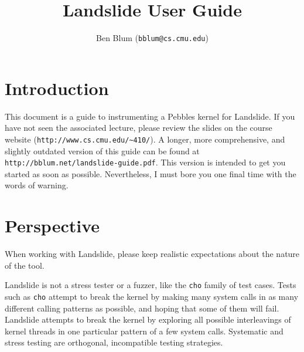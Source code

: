\documentclass{article}
\begin{document}
\captionsetup{width=.75\textwidth,font=small,labelfont=bf}
\title{\bf Landslide User Guide}
\author{Ben Blum (\texttt{bblum@cs.cmu.edu})}
\maketitle

\newcommand\true{\;\textit{true}}
\newcommand\false{\;\textit{false}}

\newcommand\alpher\alpha
\newcommand\beter\beta
\newcommand\gammer\gamma
\newcommand\delter\delta
\newcommand\zeter\zeta
\newcommand\Sigmer\Sigma

\newcommand\NN{\mathbb{N}}
\newcommand\QQ{\mathbb{Q}}
\newcommand\RR{\mathbb{R}}
\newcommand\ZZ{\mathbb{Z}}

\section{Introduction}

This document is a guide to instrumenting a Pebbles kernel for Landslide. If you have not seen the associated lecture, please review the slides on the course website (\texttt{http://www.cs.cmu.edu/{\textasciitilde}410/}).
A longer, more comprehensive, and slightly outdated version of this guide can be found at \texttt{http://bblum.net/landslide-guide.pdf}.
This version is intended to get you started as soon as possible.
Nevertheless, I must bore you one final time with the words of warning.

\section{Perspective}
\label{sec:expect}

When working with Landslide, please keep realistic expectations about the nature of the tool.

Landslide is not a stress tester or a fuzzer, like the \texttt{cho} family of test cases.
Tests such as \texttt{cho} attempt to break the kernel by making many system calls in as many different calling patterns as possible, and hoping that some of them will fail.
Landslide attempts to break the kernel by exploring all possible interleavings of kernel threads in one particular pattern of a few system calls.
Systematic and stress testing are orthogonal, incompatible testing strategies.
\end{document}
